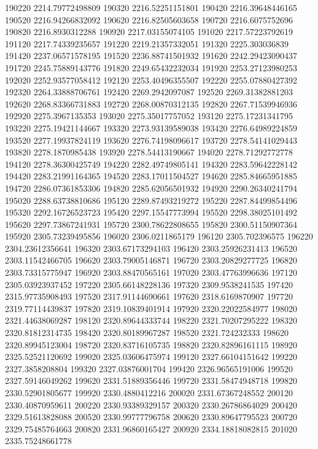 {190220 2214.79772498809
190320 2216.52251151801
190420 2216.39648446165
190520 2216.94266832092
190620 2216.82505603658
190720 2216.6075752696
190820 2216.8930312288
190920 2217.03155074105
191020 2217.57223792619
191120 2217.74339235657
191220 2219.21357332051
191320 2225.303036839
191420 2237.06571578195
191520 2236.88741501932
191620 2242.29423090437
191720 2245.75889143776
191820 2249.65432232034
191920 2253.27123980253
192020 2252.93577058412
192120 2253.40496355507
192220 2255.07880427392
192320 2264.33888706761
192420 2269.2942097087
192520 2269.31382881203
192620 2268.83366731883
192720 2268.00870312135
192820 2267.71539946936
192920 2275.3967135353
193020 2275.35017757052
193120 2275.17231341795
193220 2275.19421144667
193320 2273.93139589038
193420 2276.64989224859
193520 2277.19937824119
193620 2276.74198096617
193720 2278.54141029443
193820 2278.1870985438
193920 2278.54413190667
194020 2278.71292772778
194120 2278.36300425749
194220 2282.49749805141
194320 2283.59642228142
194420 2283.21991164365
194520 2283.17011504527
194620 2285.84665951885
194720 2286.07361853306
194820 2285.62056501932
194920 2290.26340241794
195020 2288.63738810686
195120 2289.87493219272
195220 2287.84499854496
195320 2292.16726523723
195420 2297.15547773994
195520 2298.38025101492
195620 2297.73867241931
195720 2300.78622808655
195820 2300.51150907364
195920 2305.73239495856
196020 2306.0211865179
196120 2305.702396575
196220 2304.23612356641
196320 2303.67173294103
196420 2303.25926231413
196520 2303.11542466705
196620 2303.79005146871
196720 2303.20829277725
196820 2303.73315775947
196920 2303.88470565161
197020 2303.47763996636
197120 2305.03923937452
197220 2305.66148228136
197320 2309.9538241535
197420 2315.97735908493
197520 2317.91144690661
197620 2318.6169870907
197720 2319.77114439837
197820 2319.10839401914
197920 2320.22022584977
198020 2321.44638069287
198120 2320.89644333744
198220 2321.70207295222
198320 2320.81812314735
198420 2320.80189967287
198520 2321.724232333
198620 2320.89945123004
198720 2320.83716105735
198820 2320.82896161115
198920 2325.52521120692
199020 2325.03606475974
199120 2327.66104151642
199220 2327.3858208804
199320 2327.03876001704
199420 2326.96565191006
199520 2327.59146049262
199620 2331.51889356446
199720 2331.58474948718
199820 2330.52901805677
199920 2330.4880412216
200020 2331.67367248552
200120 2330.40870959611
200220 2330.93389329157
200320 2330.26786864029
200420 2329.51613828088
200520 2330.99777796758
200620 2330.89647795523
200720 2329.75485764663
200820 2331.96860165427
200920 2334.18818082815
201020 2335.75248661778
}
